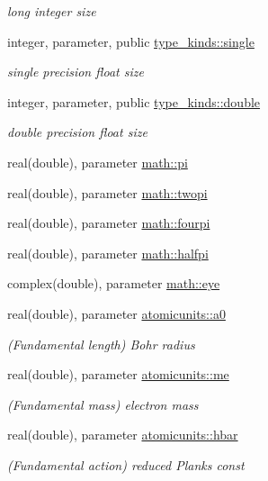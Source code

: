 \begin{DoxyCompactItemize}
\begin{DoxyCompactList}\small\item\em long integer size \end{DoxyCompactList}\item 
integer, parameter, public \hyperlink{namespacetype__kinds_a1752925d569776fd4a88872a620ed1d0}{type\+\_\+kinds\+::single}
\begin{DoxyCompactList}\small\item\em single precision float size \end{DoxyCompactList}\item 
integer, parameter, public \hyperlink{namespacetype__kinds_a34b12277eb02d1bbaaaae83e033d9890}{type\+\_\+kinds\+::double}
\begin{DoxyCompactList}\small\item\em double precision float size \end{DoxyCompactList}\item 
real(double), parameter \hyperlink{namespacemath_aa2f838077707f6cdb0c8a0ec69719690}{math\+::pi}
\item 
real(double), parameter \hyperlink{namespacemath_aeb6d7ed6a20444e26f024b34eaa4c4f7}{math\+::twopi}
\item 
real(double), parameter \hyperlink{namespacemath_a83cddb754967ada1a15217d10ed9c24b}{math\+::fourpi}
\item 
real(double), parameter \hyperlink{namespacemath_a99d72d3bce2cadc8630d10ee09aaa3ea}{math\+::halfpi}
\item 
complex(double), parameter \hyperlink{namespacemath_ae0354610846d49064ea0336f19d5bf3f}{math\+::eye}
\item 
real(double), parameter \hyperlink{namespaceatomicunits_aa4859dbb9e7739ae603b78d9f2c58f93}{atomicunits\+::a0}
\begin{DoxyCompactList}\small\item\em (Fundamental length) Bohr radius \end{DoxyCompactList}\item 
real(double), parameter \hyperlink{namespaceatomicunits_a02f36d49c4a56d1cc84c8cda6c631a68}{atomicunits\+::me}
\begin{DoxyCompactList}\small\item\em (Fundamental mass) electron mass \end{DoxyCompactList}\item 
real(double), parameter \hyperlink{namespaceatomicunits_a7dffaade5d28d129a3726e8eff794447}{atomicunits\+::hbar}
\begin{DoxyCompactList}\small\item\em (Fundamental action) reduced Planks const \end{DoxyCompactList}\item 

\end{DoxyCompactItemize}
